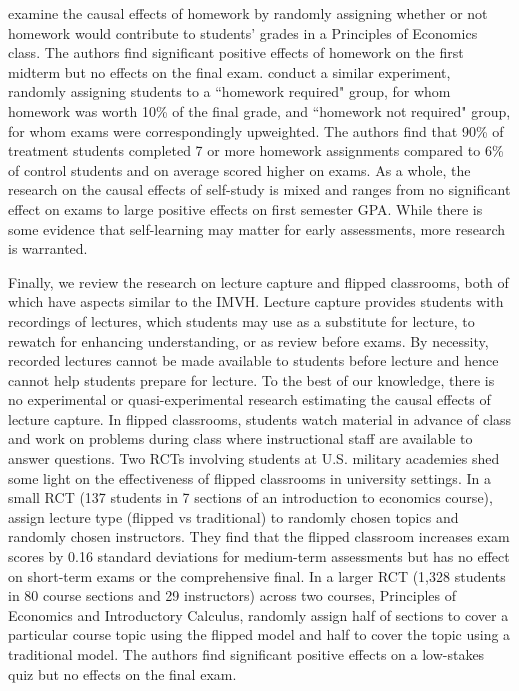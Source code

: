 \documentclass[12pt]{article}
\begin{document}
\textcite{ts2012} examine the causal effects of homework by randomly assigning whether or not homework would contribute to students' grades in a Principles of Economics class. The authors find significant positive effects of homework on the first midterm but no effects on the final exam. \textcite{gr2013} conduct a similar experiment, randomly assigning students to a ``homework required" group, for whom homework was worth 10\% of the final grade, and ``homework not required" group, for whom exams were correspondingly upweighted. The authors find that 90\% of treatment students completed 7 or more homework assignments compared to 6\% of control students and on average scored higher on exams. As a whole, the research on the causal effects of self-study is mixed and ranges from no significant effect on exams to large positive effects on first semester GPA. While there is some evidence that self-learning may matter for early assessments, more research is warranted.

Finally, we review the research on lecture capture and flipped classrooms, both of which have aspects similar to the IMVH. Lecture capture provides students with recordings of lectures, which students may use as a substitute for lecture, to rewatch for enhancing understanding, or as review before exams. By necessity, recorded lectures cannot be made available to students before lecture and hence cannot help students prepare for lecture. To the best of our knowledge, there is no experimental or quasi-experimental research estimating the causal effects of lecture capture. In flipped classrooms, students watch material in advance of class and work on problems during class where instructional staff are available to answer questions. Two RCTs involving students at U.S. military academies shed some light on the effectiveness of flipped classrooms in university settings. In a small RCT (137 students in 7 sections of an introduction to economics course), \textcite{wbi2018} assign lecture type (flipped vs traditional) to randomly chosen topics and randomly chosen instructors. They find that the flipped classroom increases exam scores by 0.16 standard deviations for medium-term assessments but has no effect on short-term exams or the comprehensive final. In a larger RCT (1,328 students in 80 course sections and 29 instructors) across two courses, Principles of Economics and Introductory Calculus, \textcite{sgmy2021} randomly assign half of sections to cover a particular course topic using the flipped model and half to cover the topic using a traditional model. The authors find significant positive effects on a low-stakes quiz but no effects on the final exam.
\end{document}
